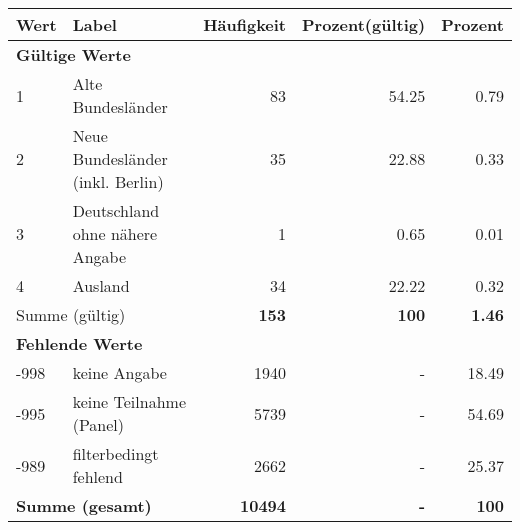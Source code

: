      \begin{longtable}{lXrrr}
     \toprule
     \textbf{Wert} & \textbf{Label} & \textbf{Häufigkeit} & \textbf{Prozent(gültig)} & \textbf{Prozent} \\
     \endhead
     \midrule
     \multicolumn{5}{l}{\textbf{Gültige Werte}}\\

     1 &
     \multicolumn{1}{X}{ Alte Bundesländer   } &


       \num{83} &
       \num[round-mode=places,round-precision=2]{54,25} &
         \num[round-mode=places,round-precision=2]{0,79} \\

     2 &
     \multicolumn{1}{X}{ Neue Bundesländer (inkl. Berlin)   } &


       \num{35} &
       \num[round-mode=places,round-precision=2]{22,88} &
         \num[round-mode=places,round-precision=2]{0,33} \\

     3 &
     \multicolumn{1}{X}{ Deutschland ohne nähere Angabe   } &


       \num{1} &
       \num[round-mode=places,round-precision=2]{0,65} &
         \num[round-mode=places,round-precision=2]{0,01} \\

     4 &
     \multicolumn{1}{X}{ Ausland   } &


       \num{34} &
       \num[round-mode=places,round-precision=2]{22,22} &
         \num[round-mode=places,round-precision=2]{0,32} \\
     \midrule
     \multicolumn{2}{l}{Summe (gültig)} &
       \textbf{\num{153}} &
     \textbf{100} &
       \textbf{\num[round-mode=places,round-precision=2]{1,46}} \\
     \multicolumn{5}{l}{\textbf{Fehlende Werte}}\\
       -998 &
       keine Angabe &
         \num{1940} &
        - &
         \num[round-mode=places,round-precision=2]{18,49} \\
       -995 &
       keine Teilnahme (Panel) &
         \num{5739} &
        - &
         \num[round-mode=places,round-precision=2]{54,69} \\
       -989 &
       filterbedingt fehlend &
         \num{2662} &
        - &
         \num[round-mode=places,round-precision=2]{25,37} \\
     \midrule
     \multicolumn{2}{l}{\textbf{Summe (gesamt)}} &
          \textbf{\num{10494}} &
        \textbf{-} &
        \textbf{100} \\
     \bottomrule
     \end{longtable}
     
